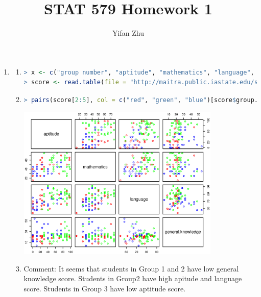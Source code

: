 \documentclass{article}
\begin{document}
	

	
	\title{STAT 579 Homework 1}
	\author{Yifan Zhu}
	\maketitle
	
	\begin{enumerate}[leftmargin = 0 em, label = \arabic*., font = \bfseries]
	\item \begin{enumerate}
	\item \begin{lstlisting}[language = R]
> x <- c("group number", "aptitude", "mathematics", "language", "general knowledge")
> score <- read.table(file = "http://maitra.public.iastate.edu/stat579/datasets/student-apt.dat", col.names = x)
	\end{lstlisting}

	\item
\begin{lstlisting}[language = R]
> pairs(score[2:5], col = c("red", "green", "blue")[score$group.number])
\end{lstlisting}
\begin{center}
\includegraphics[width = 0.8\textwidth]{Rplot.eps}
\end{center}

\item Comment: It seems that students in Group 1 and 2 have low general knowledge score. Students in Group2 have high apitude and language score. Students in Group 3 have low aptitude score. 
	\end{enumerate}
	
	

	\newpage 


\end{enumerate}
\end{document}
